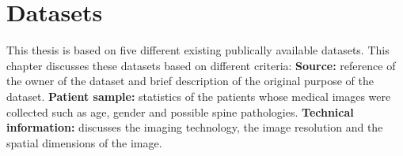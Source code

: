 \chapter{Datasets\label{sec:datasets}}\thispagestyle{empty}
\par{
    This thesis is based on five different existing publically available datasets.
    This chapter discusses these datasets based on different criteria: \newline
    \textbf{Source:} reference of the owner of the dataset and brief description of the original purpose of the dataset.\newline
    \textbf{Patient sample:} statistics of the patients whose medical images were collected such as age, gender and possible spine pathologies.\newline
    \textbf{Technical information:} discusses the imaging technology, the image resolution and the spatial dimensions of the image. 
}
